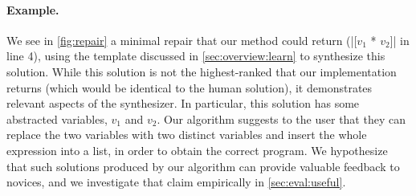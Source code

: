 \paragraph{Example.} We see in \autoref{fig:repair} a minimal repair that our
method could return (|[$v_1$ * $v_2$]| in line 4), using the template discussed
in \autoref{sec:overview:learn} to synthesize this solution. While this solution
is not the highest-ranked that our implementation returns (which would be
identical to the human solution), it demonstrates relevant aspects of the
synthesizer. In particular, this solution has some abstracted variables, $v_1$
and $v_2$. Our algorithm suggests to the user that they can replace the two
variables with two distinct variables and insert the whole expression into a
list, in order to obtain the correct program. We hypothesize that such solutions
produced by our algorithm can provide valuable feedback to novices, and we
investigate that claim empirically in \autoref{sec:eval:useful}.
